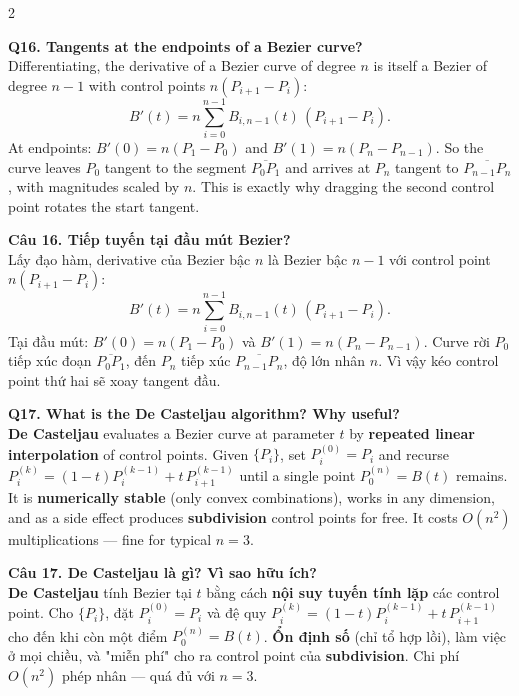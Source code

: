 \begin{paracol}{2}
\switchcolumn*

\textbf{Q16. Tangents at the endpoints of a Bezier curve?}\\
Differentiating, the derivative of a Bezier curve of degree $n$ is itself a Bezier of degree $n-1$ with control points $n(P_{i+1}-P_i)$:
\[ B'(t) = n \sum_{i=0}^{n-1} B_{i,n-1}(t)\,(P_{i+1}-P_i). \]
At endpoints: $B'(0)=n(P_1-P_0)$ and $B'(1)=n(P_n-P_{n-1})$. So the curve leaves $P_0$ tangent to the segment $\overline{P_0 P_1}$ and arrives at $P_n$ tangent to $\overline{P_{n-1}P_n}$, with magnitudes scaled by $n$. This is exactly why dragging the second control point rotates the start tangent.

\switchcolumn

\textbf{Câu 16. Tiếp tuyến tại đầu mút Bezier?}\\
Lấy đạo hàm, derivative của Bezier bậc $n$ là Bezier bậc $n-1$ với control point $n(P_{i+1}-P_i)$:
\[ B'(t) = n \sum_{i=0}^{n-1} B_{i,n-1}(t)\,(P_{i+1}-P_i). \]
Tại đầu mút: $B'(0)=n(P_1-P_0)$ và $B'(1)=n(P_n-P_{n-1})$. Curve rời $P_0$ tiếp xúc đoạn $\overline{P_0 P_1}$, đến $P_n$ tiếp xúc $\overline{P_{n-1}P_n}$, độ lớn nhân $n$. Vì vậy kéo control point thứ hai sẽ xoay tangent đầu.

\switchcolumn*

\textbf{Q17. What is the De Casteljau algorithm? Why useful?}\\
\textbf{De Casteljau} evaluates a Bezier curve at parameter $t$ by \textbf{repeated linear interpolation} of control points. Given $\{P_i\}$, set $P_i^{(0)}=P_i$ and recurse $P_i^{(k)}=(1-t)P_i^{(k-1)}+t\,P_{i+1}^{(k-1)}$ until a single point $P_0^{(n)}=B(t)$ remains. It is \textbf{numerically stable} (only convex combinations), works in any dimension, and as a side effect produces \textbf{subdivision} control points for free. It costs $O(n^2)$ multiplications — fine for typical $n=3$.

\switchcolumn

\textbf{Câu 17. De Casteljau là gì? Vì sao hữu ích?}\\
\textbf{De Casteljau} tính Bezier tại $t$ bằng cách \textbf{nội suy tuyến tính lặp} các control point. Cho $\{P_i\}$, đặt $P_i^{(0)}=P_i$ và đệ quy $P_i^{(k)}=(1-t)P_i^{(k-1)}+t\,P_{i+1}^{(k-1)}$ cho đến khi còn một điểm $P_0^{(n)}=B(t)$. \textbf{Ổn định số} (chỉ tổ hợp lồi), làm việc ở mọi chiều, và "miễn phí" cho ra control point của \textbf{subdivision}. Chi phí $O(n^2)$ phép nhân — quá đủ với $n=3$.

\switchcolumn*


\end{paracol}
